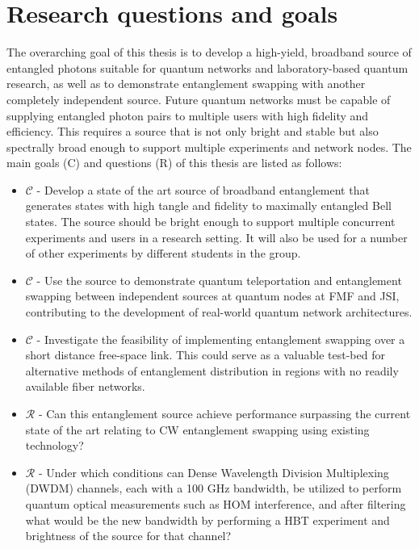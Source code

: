 \documentclass{article}
\theoremstyle{mytheoremstyle}
\theoremstyle{mytheoremstyle}
\theoremstyle{myproblemstyle}
\begin{document}
\section{Research questions and goals}
The overarching goal of this thesis is to develop a high-yield,
broadband source of entangled photons suitable for quantum networks and laboratory-based quantum research,
as well as to demonstrate entanglement swapping with another completely independent source.
Future quantum networks must be capable of supplying entangled photon pairs to multiple users with high fidelity and efficiency.
This requires a source that is not only bright and stable but also spectrally broad enough to support multiple experiments and network nodes.
The main goals (C) and questions (R) of this thesis are listed as follows:

\begin{minipage}{0.95\textwidth}
	\begin{itemize}
		\item[] \textbf{\textit{$\mathcal{C}$}} - Develop a state of the art source of broadband entanglement that generates states with high tangle
		      and fidelity to maximally entangled Bell states.
		      The source should be bright enough to support multiple concurrent experiments and users in a research setting.
		      It will also be used for a number of other experiments by different students in the group.

		\item[] \textbf{\textit{$\mathcal{C}$}} - Use the source to demonstrate quantum teleportation and entanglement swapping between independent
		      sources at quantum nodes at FMF and JSI, contributing to the development of real-world quantum network architectures.

		\item[] \textbf{\textit{$\mathcal{C}$}} - Investigate the feasibility of implementing entanglement swapping over a short distance free-space link.
		      This could serve as a valuable test-bed for alternative methods of entanglement distribution in regions with no readily available fiber networks.

		\item[] \textbf{\textit{$\mathcal{R}$}} - Can this entanglement source achieve performance surpassing the current state of the
		      art relating to CW entanglement swapping using existing technology?


		\item[] \textbf{\textit{$\mathcal{R}$}} - Under which conditions can Dense Wavelength Division Multiplexing (DWDM) channels,
		      each with a 100 GHz bandwidth, be utilized to perform quantum optical measurements such as HOM interference,
		      and after filtering what would be the new bandwidth by performing a HBT experiment and brightness of the source for that channel?
	\end{itemize}
\end{minipage}
\end{document}
